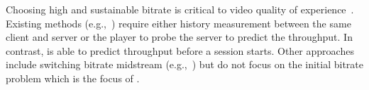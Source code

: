 

 Choosing high and sustainable bitrate is
critical to video quality of experience~\cite{sigcomm13athula}.  
 Existing methods (e.g.,~\cite{miller2015low,festive})
require either history measurement between the same client and server or the
player to probe the server to predict the throughput. In contrast, \name is able to predict
throughput before a session starts. 
 Other approaches include switching bitrate midstream (e.g.,~\cite{huang2014buffer,tian2012towards,yin2014toward})
 but do not focus on the initial bitrate problem which is the focus of \name.



